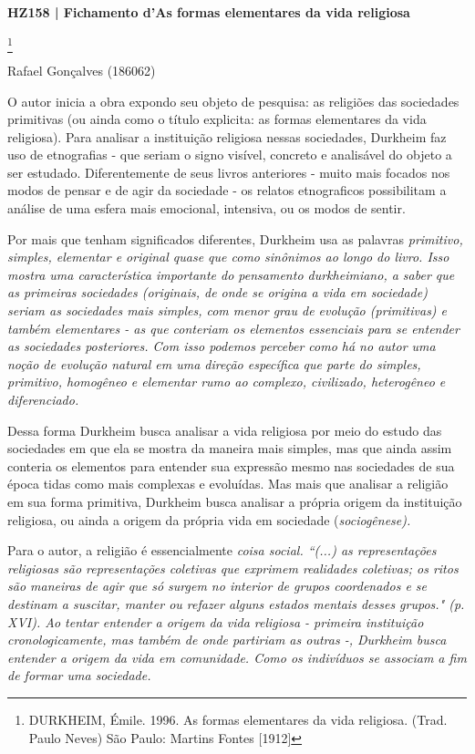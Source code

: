 \documentclass[12pt,a4paper]{article}
\begin{document}
\noindent
\centerline{\large\textbf{HZ158 | Fichamento d'As formas elementares da vida religiosa}}\footnote{DURKHEIM, Émile. 1996. As formas elementares da vida religiosa. (Trad. Paulo Neves) São Paulo: Martins Fontes [1912]}
\centerline{\large Rafael Gonçalves (186062)}
\break
\noindent
O autor inicia a obra expondo seu objeto de pesquisa: as religiões das sociedades primitivas (ou ainda como o título explicita: as formas elementares da vida religiosa). Para analisar a instituição religiosa nessas sociedades, Durkheim faz uso de etnografias - que seriam o signo visível, concreto e analisável do objeto a ser estudado. Diferentemente de seus livros anteriores - muito mais focados nos modos de pensar e de agir da sociedade - os relatos etnograficos possibilitam a análise de uma esfera mais emocional, intensiva, ou os modos de sentir.

Por mais que tenham significados diferentes, Durkheim usa as palavras \em primitivo\em , \em simples\em , \em elementar \em e \em original \em quase que como sinônimos ao longo do livro. Isso mostra uma característica importante do pensamento durkheimiano, a saber que as primeiras sociedades (originais, de onde se origina a vida em sociedade) seriam as sociedades mais simples, com menor grau de evolução (primitivas) e também elementares - as que conteriam os elementos essenciais para se entender as sociedades posteriores. Com isso podemos perceber como há no autor uma noção de evolução \em natural \em em uma direção específica que parte do simples, primitivo, homogêneo e elementar rumo ao complexo, civilizado, heterogêneo e diferenciado.

Dessa forma Durkheim busca analisar a vida religiosa por meio do estudo das sociedades em que ela se mostra da maneira mais simples, mas que ainda assim conteria os elementos para entender sua expressão mesmo nas sociedades de sua época tidas como mais complexas e evoluídas. Mas mais que analisar a religião em sua forma primitiva, Durkheim busca analisar a própria origem da instituição religiosa, ou ainda a origem da própria vida em sociedade (\em sociogênese\em ).

Para o autor, a religião é essencialmente \em coisa social\em .
``(...) as representações religiosas são representações coletivas que exprimem realidades coletivas; os ritos são maneiras de agir que só surgem no interior de grupos coordenados e se destinam a suscitar, manter ou refazer alguns estados mentais desses grupos." (p. XVI).
Ao tentar entender a origem da vida religiosa - primeira instituição cronologicamente, mas também de onde partiriam as outras -, Durkheim busca entender a origem da vida em comunidade. Como os indivíduos se associam a fim de formar uma sociedade.
\end{document}
